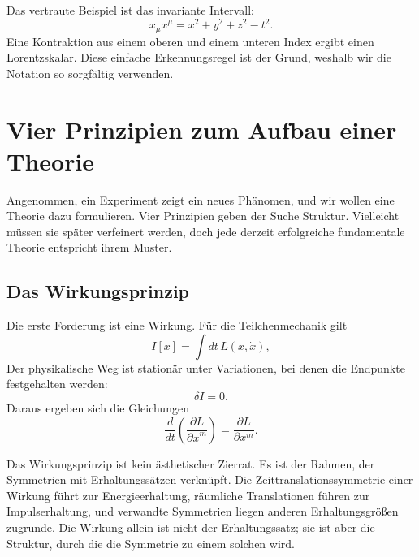 \begin{classroomqa}
\end{classroomqa}

Das vertraute Beispiel ist das invariante Intervall:
\begin{equation}
x_\mu x^\mu
=
x^2+y^2+z^2-t^2.
\label{eq:sr7-interval}
\end{equation}
Eine Kontraktion aus einem oberen und einem unteren Index ergibt einen Lorentzskalar. Diese einfache Erkennungsregel ist der Grund, weshalb wir die Notation so sorgfältig verwenden.

\section{Vier Prinzipien zum Aufbau einer Theorie}

Angenommen, ein Experiment zeigt ein neues Phänomen, und wir wollen eine Theorie dazu formulieren. Vier Prinzipien geben der Suche Struktur. Vielleicht müssen sie später verfeinert werden, doch jede derzeit erfolgreiche fundamentale Theorie entspricht ihrem Muster.

\subsection{Das Wirkungsprinzip}

Die erste Forderung ist eine Wirkung. Für die Teilchenmechanik gilt
\begin{equation}
I[x]
=
\int dt\,L(x,\dot x),
\label{eq:sr7-particle-action-general}
\end{equation}
Der physikalische Weg ist stationär unter Variationen, bei denen die Endpunkte festgehalten werden:
\begin{equation}
\delta I=0.
\end{equation}
Daraus ergeben sich die Gleichungen
\begin{equation}
\frac{d}{dt}
\left(
\frac{\partial L}{\partial\dot x^m}
\right)
=
\frac{\partial L}{\partial x^m}.
\label{eq:sr7-EL}
\end{equation}

Das Wirkungsprinzip ist kein ästhetischer Zierrat. Es ist der Rahmen, der Symmetrien mit Erhaltungssätzen verknüpft. Die Zeittranslationssymmetrie einer Wirkung führt zur Energieerhaltung, räumliche Translationen führen zur Impulserhaltung, und verwandte Symmetrien liegen anderen Erhaltungsgrößen zugrunde. Die Wirkung allein ist nicht der Erhaltungssatz; sie ist aber die Struktur, durch die die Symmetrie zu einem solchen wird.

